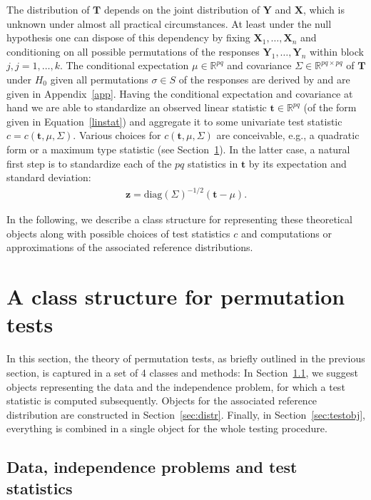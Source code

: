 \documentclass[article]{jss}
\newcommand{\R}{\mathbb{R} }
\newcommand{\z}{\mathbf{z}}
\newcommand{\X}{\mathbf{X}}
\newcommand{\Y}{\mathbf{Y}}
\newcommand{\T}{\mathbf{T}}
\renewcommand{\t}{\mathbf{t}}
\begin{document}
The distribution of $\T$  depends on the joint
distribution of $\Y$ and $\X$, which is unknown under almost all practical
circumstances. At least under the null hypothesis one can dispose of this
dependency by fixing $\X_1, \dots, \X_n$ and conditioning on all possible
permutations of the responses $\Y_1, \dots, \Y_n$ within block $j, j = 1, \dots, k$. 
The conditional expectation $\mu \in \R^{pq}$ and covariance 
$\Sigma \in \R^{pq \times pq}$ 
of $\T$ under $H_0$ given
all permutations $\sigma \in S$ of the responses are derived by
\cite{StrasserWeber1999} and are given in Appendix~\ref{app}.
Having the conditional expectation and covariance at hand we are able to
standardize an observed linear statistic $\t \in \R^{pq}$ (of the form
given in Equation~\ref{linstat}) and aggregate it to some univariate test
statistic $c = c(\t, \mu,\Sigma)$. Various choices for $c(\t, \mu,\Sigma)$
are conceivable, e.g., a quadratic form or a maximum type statistic
(see Section~\ref{sec:class}). 
In the latter case, a natural first step
is to standardize each of the $pq$ statistics in $\t$ by its expectation and
standard deviation:
\begin{eqnarray} \label{standstat}
\z = \text{diag}(\Sigma)^{-1/2} (\mathbf{t} - \mu).
\end{eqnarray}

In the following, we describe a class structure for representing these
theoretical objects along with possible choices of test statistics $c$
and computations or approximations of the associated reference
distributions.


\section{A class structure for permutation tests} \label{sec:class}

In this section, the theory of permutation tests, as briefly outlined in the previous
section, is captured in a set of 4 classes and methods: In
Section~\ref{sec:data}, we suggest objects representing the data and the independence
problem, for which a test statistic is computed subsequently.
Objects for the associated reference distribution are constructed in Section~\ref{sec:distr}.
Finally, in Section~\ref{sec:testobj}, everything is combined in a single object
for the whole testing procedure.

\subsection{Data, independence problems and test statistics} \label{sec:data}
\end{document}
